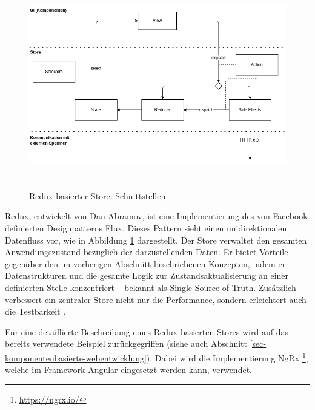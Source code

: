 \documentclass[12pt]{book}          %
\begin{document}
\begin{figure}[htbp]
\centering
\includegraphics[height=9cm]{abbildungen/redux-interfaces.png}
\caption{Redux-basierter Store: Schnittstellen}
\label{abb-redux-interfaces}
\end{figure}

Redux, entwickelt von Dan Abramov, ist eine Implementierung des von Facebook definierten Designpatterns Flux. Dieses Pattern sieht einen unidirektionalen Datenfluss vor, wie in Abbildung \ref{abb-redux-interfaces} dargestellt. Der Store verwaltet den gesamten Anwendungszustand bezüglich der darzustellenden Daten. Er bietet Vorteile gegenüber den im vorherigen Abschnitt beschriebenen Konzepten, indem er Datenstrukturen und die gesamte Logik zur Zustandsaktualisierung an einer definierten Stelle konzentriert – bekannt als Single Source of Truth. Zusätzlich verbessert ein zentraler Store nicht nur die Performance, sondern erleichtert auch die Testbarkeit \cite[31-32]{farhi_adding_2017}.

Für eine detaillierte Beschreibung eines Redux-basierten Stores wird auf das bereits verwendete Beispiel zurückgegriffen (siehe auch Abschnitt \ref{sec-komponentenbasierte-webentwicklung}). Dabei wird die Implementierung NgRx \footnote{\url{https://ngrx.io/}}, welche im Framework Angular eingesetzt werden kann, verwendet.
\end{document}
